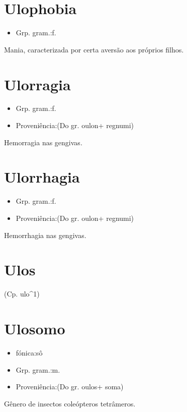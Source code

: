 \documentclass{article}
\begin{document}
\section{Ulophobia}
\begin{itemize}
\item {Grp. gram.:f.}
\end{itemize}
Mania, caracterizada por certa aversão aos próprios filhos.
\section{Ulorragia}
\begin{itemize}
\item {Grp. gram.:f.}
\end{itemize}
\begin{itemize}
\item {Proveniência:(Do gr. \textunderscore oulon\textunderscore  + \textunderscore regnumi\textunderscore )}
\end{itemize}
Hemorragia nas gengivas.
\section{Ulorrhagia}
\begin{itemize}
\item {Grp. gram.:f.}
\end{itemize}
\begin{itemize}
\item {Proveniência:(Do gr. \textunderscore oulon\textunderscore  + \textunderscore regnumi\textunderscore )}
\end{itemize}
Hemorrhagia nas gengivas.
\section{Ulos}
(Cp. \textunderscore ulo\textunderscore ^1)
\section{Ulosomo}
\begin{itemize}
\item {fónica:sô}
\end{itemize}
\begin{itemize}
\item {Grp. gram.:m.}
\end{itemize}
\begin{itemize}
\item {Proveniência:(Do gr. \textunderscore oulos\textunderscore  + \textunderscore soma\textunderscore )}
\end{itemize}
Gênero de insectos coleópteros tetrâmeros.
\end{document}
